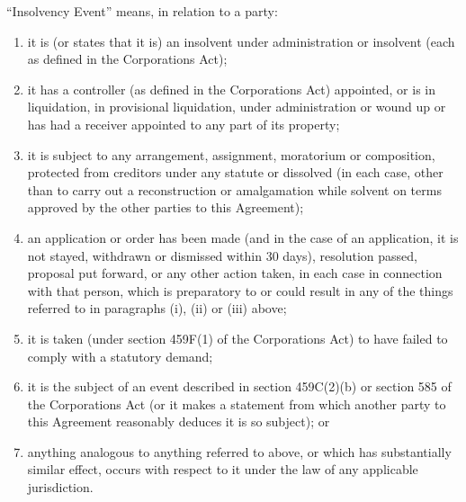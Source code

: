``Insolvency Event'' means, in relation to a party:
\begin{enumerate}[label=(\roman*)]
\item it is (or states that it is) an insolvent under administration or insolvent (each as defined in the Corporations Act);
\item it has a controller (as defined in the Corporations Act) appointed, or is in liquidation, in provisional liquidation, under administration or wound up or has had a receiver appointed to any part of its property;
\item it is subject to any arrangement, assignment, moratorium or composition, protected from creditors under any statute or dissolved (in each case, other than to carry out a reconstruction or amalgamation while solvent on terms approved by the other parties to this Agreement);
\item an application or order has been made (and in the case of an application, it is not stayed, withdrawn or dismissed within 30 days), resolution passed, proposal put forward, or any other action taken, in each case in connection with that person, which is preparatory to or could result in any of the things referred to in paragraphs (i), (ii) or (iii) above;
\item it is taken (under section 459F(1) of the Corporations Act) to have failed to comply with a statutory demand;
\item it is the subject of an event described in section 459C(2)(b) or section 585 of the Corporations Act (or it makes a statement from which another party to this Agreement reasonably deduces it is so subject); or
\item anything analogous to anything referred to above, or which has substantially similar effect, occurs with respect to it under the law of any applicable jurisdiction.
\end{enumerate}

